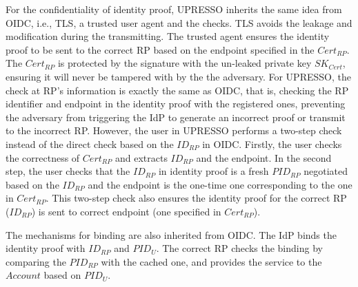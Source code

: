 For the confidentiality of identity proof, UPRESSO inherits the same idea from OIDC, i.e., TLS, a trusted user agent and the checks. TLS avoids the leakage and modification during the transmitting. The trusted agent ensures the identity proof to be sent to the correct RP based on the endpoint specified in the $Cert_{RP}$. The  $Cert_{RP}$ is protected by the signature with the un-leaked private key $SK_{Cert}$, ensuring it  will never be tampered with by the the adversary. For UPRESSO, the check at RP's information is exactly the same as OIDC, that is, checking the RP identifier and endpoint in the identity proof with the registered ones, preventing the adversary from triggering the IdP to
generate an incorrect proof or transmit to the incorrect RP. However, the user in UPRESSO performs a two-step check instead of the direct check based on the $ID_{RP}$ in OIDC. Firstly, the user checks the correctness of $Cert_{RP}$ and extracts  $ID_{RP}$ and the endpoint. In the second step, the user checks that the $ID_{RP}$ in identity proof is a fresh $PID_{RP}$ negotiated based on the $ID_{RP}$ and the endpoint is the one-time one corresponding to the one in $Cert_{RP}$. This two-step check also ensures the identity proof for the correct RP ($ID_{RP}$) is sent to correct endpoint (one specified in $Cert_{RP}$).

The mechanisms for binding are also inherited from OIDC. The IdP binds the identity proof with $ID_{RP}$ and $PID_{U}$. The correct RP checks the binding by comparing the $PID_{RP}$ with the cached one, and provides the service  to the $Account$ based on $PID_U$.


